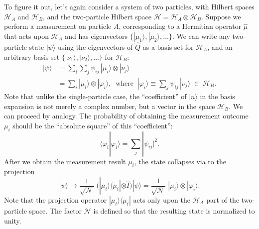 \documentclass[pra,11pt]{revtex4}
\begin{document}
To figure it out, let's again consider a system of two particles, with
Hilbert spaces $\mathscr{H}_A$ and $\mathscr{H}_B$, and the
two-particle Hilbert space $\mathscr{H} = \mathscr{H}_A \otimes
\mathscr{H}_B$.  Suppose we perform a measurement on particle $A$,
corresponding to a Hermitian operator $\hat{\mu}$ that acts upon
$\mathscr{H}_A$ and has eigenvectors $\{|\mu_1\rangle,
|\mu_2\rangle,\dots\}$.  We can write any two-particle state
$|\psi\rangle$ using the eigenvectors of $\hat{Q}$ as a basis set for
$\mathscr{H}_A$, and an arbitrary basis set $\{|\nu_1\rangle,
|\nu_2\rangle,\dots\}$ for $\mathscr{H}_B$:
$$\begin{aligned}|\psi\rangle &= \sum_{i}\sum_{j} \psi_{ij}\, |\mu_i\rangle\otimes |\nu_j\rangle \\&= \sum_i |\mu_i\rangle\otimes |\varphi_i\rangle, \;\;\mathrm{where}\;\;|\varphi_i\rangle\equiv \sum_j \psi_{ij}\,|\nu_j\rangle \;\in\; \mathscr{H}_B.\end{aligned}$$
Note that unlike the single-particle case, the ``coefficient'' of
$|n\rangle$ in the basis expansion is not merely a complex number, but
a vector in the space $\mathscr{H}_B$.  We can proceed by
analogy.  The probability of obtaining the measurement outcome $\mu_i$
should be the ``absolute square'' of this ``coefficient'':
$$\langle \varphi_i|\varphi_i\rangle = \sum_j |\psi_{ij}|^2.$$
After we obtain the measurement result $\mu_i$, the state collapses
via to the projection
$$|\psi\rangle \longrightarrow \frac{1}{\sqrt{\mathcal{N}}}\; \Big(|\mu_i\rangle\langle \mu_i| \otimes \hat{I}\Big) |\psi\rangle = \frac{1}{\sqrt{\mathcal{N}}}\; |\mu_i\rangle\otimes |\varphi_i\rangle.$$
Note that the projection operator $|\mu_i\rangle\langle \mu_i|$ acts
only upon the $\mathscr{H}_A$ part of the two-particle space.  The
factor $\mathcal{N}$ is defined so that the resulting state is
normalized to unity.
\end{document}
